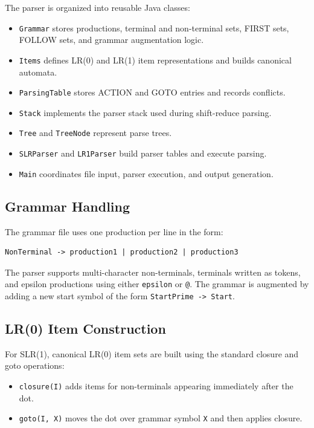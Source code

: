 \documentclass[12pt]{article}
\begin{document}
The parser is organized into reusable Java classes:
\begin{itemize}[leftmargin=1.5em]
    \item \texttt{Grammar} stores productions, terminal and non-terminal sets, FIRST sets, FOLLOW sets, and grammar augmentation logic.
    \item \texttt{Items} defines LR(0) and LR(1) item representations and builds canonical automata.
    \item \texttt{ParsingTable} stores ACTION and GOTO entries and records conflicts.
    \item \texttt{Stack} implements the parser stack used during shift-reduce parsing.
    \item \texttt{Tree} and \texttt{TreeNode} represent parse trees.
    \item \texttt{SLRParser} and \texttt{LR1Parser} build parser tables and execute parsing.
    \item \texttt{Main} coordinates file input, parser execution, and output generation.
\end{itemize}

\subsection{Grammar Handling}

The grammar file uses one production per line in the form:

\begin{lstlisting}[style=reportstyle]
NonTerminal -> production1 | production2 | production3
\end{lstlisting}

The parser supports multi-character non-terminals, terminals written as tokens, and epsilon productions using either \texttt{epsilon} or \texttt{@}. The grammar is augmented by adding a new start symbol of the form \texttt{StartPrime -> Start}.

\subsection{LR(0) Item Construction}

For SLR(1), canonical LR(0) item sets are built using the standard closure and goto operations:
\begin{itemize}[leftmargin=1.5em]
    \item \texttt{closure(I)} adds items for non-terminals appearing immediately after the dot.
    \item \texttt{goto(I, X)} moves the dot over grammar symbol \texttt{X} and then applies closure.
\end{itemize}
\end{document}
